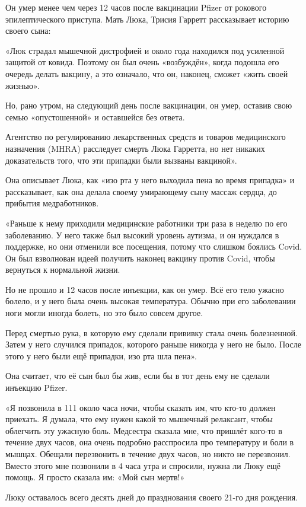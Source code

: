 Он умер менее чем через 12 часов после вакцинации Pfizer от рокового
эпилептического приступа. Мать Люка, Трисия Гарретт рассказывает историю своего
сына:

«Люк страдал мышечной дистрофией и около года находился под усиленной защитой от
ковида. Поэтому он был очень «возбуждён», когда подошла его очередь делать
вакцину, а это означало, что он, наконец, сможет «жить своей жизнью».

Но, рано утром, на следующий день после вакцинации, он умер, оставив свою семью
«опустошенной» и оставшейся без ответа.

Агентство по регулированию лекарственных средств и товаров медицинского
назначения (MHRA) расследует смерть Люка Гарретта, но нет никаких доказательств
того, что эти припадки были вызваны вакциной».

Она описывает Люка, как «изо рта у него выходила пена во время припадка» и
рассказывает, как она делала своему умирающему сыну массаж сердца, до прибытия
медработников.

«Раньше к нему приходили медицинские работники три раза в неделю по его
заболеванию. У него также был высокий уровень аутизма, и он нуждался в
поддержке, но они отменили все посещения, потому что слишком боялись Covid. Он
был взволнован идеей получить наконец вакцину против Covid, чтобы вернуться к
нормальной жизни.

Но не прошло и 12 часов после инъекции, как он умер. Всё его тело ужасно болело,
и у него была очень высокая температура. Обычно при его заболевании ноги могли
иногда болеть, но это было совсем другое.

Перед смертью рука, в которую ему сделали прививку стала очень
болезненной. Затем у него случился припадок, которого раньше никогда у него не
было. После этого у него были ещё припадки, изо рта шла пена».

Она считает, что её сын был бы жив, если бы в тот день ему не сделали инъекцию
Pfizer.

«Я позвонила в 111 около часа ночи, чтобы сказать им, что кто-то должен
приехать. Я думала, что ему нужен какой то мышечный релаксант, чтобы облегчить
эту ужасную боль. Медсестра сказала мне, что пришлёт кого-то в течение двух
часов, она очень подробно расспросила про температуру и боли в мышцах. Обещали
перезвонить в течение двух часов, но никто не перезвонил. Вместо этого мне
позвонили в 4 часа утра и спросили, нужна ли Люку ещё помощь. Я просто сказала
им: «Мой сын мертв!»

Люку оставалось всего десять дней до празднования своего 21-го дня рождения.


